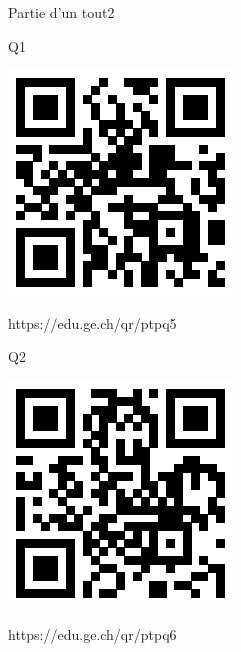 \documentclass[a4paper,11pt]{report}
\begin{document}
\begin{qmoodle}{Partie d'un tout}{2}{
	\begin{center}	
		Q1

\includegraphics[scale=1]{media/qr/ptpq5}

\tiny{{https://edu.ge.ch/qr/ptpq5}}
\end{center}
	\begin{center}	
		Q2

\includegraphics[scale=1]{media/qr/ptpq6}

\tiny{{https://edu.ge.ch/qr/ptpq6}}
\end{center}
}
\end{qmoodle}
\end{document}
